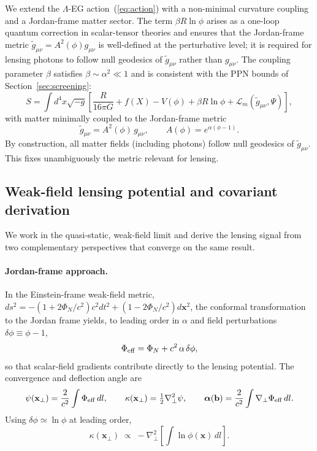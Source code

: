 \documentclass[11pt,a4paper]{article}
\begin{document}
We extend the $\Lambda$-EG action~(\ref{eq:action}) with a non-minimal curvature
coupling and a Jordan-frame matter sector. The term $\beta R\ln\phi$ arises as a
one-loop quantum correction in scalar-tensor theories and ensures that the
Jordan-frame metric $\tilde{g}_{\mu\nu} = A^2(\phi)g_{\mu\nu}$ is well-defined at
the perturbative level; it is required for lensing photons to follow null geodesics
of $\tilde{g}_{\mu\nu}$ rather than $g_{\mu\nu}$. The coupling parameter $\beta$
satisfies $\beta\sim\alpha^2\ll 1$ and is consistent with the PPN bounds of
Section~\ref{sec:screening}:
\begin{equation}
  S = \int d^4x\sqrt{-g}\left[\frac{R}{16\pi G} + f(X) - V(\phi)
  + \beta R\ln\phi
  + \mathcal{L}_m(\tilde{g}_{\mu\nu},\Psi)\right],
  \label{eq:action_lensing}
\end{equation}
with matter minimally coupled to the Jordan-frame metric
\begin{equation}
  \tilde{g}_{\mu\nu} = A^2(\phi)\,g_{\mu\nu},\qquad A(\phi) = e^{\alpha(\phi-1)}.
\end{equation}
By construction, all matter fields (including photons) follow null geodesics of
$\tilde{g}_{\mu\nu}$. This fixes unambiguously the metric relevant for lensing.

\subsection{Weak-field lensing potential and covariant derivation}
\label{subsec:lensing_WF}

We work in the quasi-static, weak-field limit and derive the lensing signal
from two complementary perspectives that converge on the same result.

\paragraph{Jordan-frame approach.}
In the Einstein-frame weak-field metric,
$ds^2 = -(1+2\Phi_N/c^2)c^2dt^2 + (1-2\Phi_N/c^2)d\mathbf{x}^2$,
the conformal transformation to the Jordan frame yields, to leading order in
$\alpha$ and field perturbations $\delta\phi \equiv \phi - 1$,
\begin{equation}
  \Phi_{\rm eff} = \Phi_N + c^2\,\alpha\,\delta\phi,
  \label{eq:Phieff}
\end{equation}
so that scalar-field gradients contribute directly to the lensing potential.
The convergence and deflection angle are
\begin{equation}
  \psi(\mathbf{x}_\perp) = \frac{2}{c^2}\int\Phi_{\rm eff}\,dl,
  \qquad
  \kappa(\mathbf{x}_\perp) = \tfrac{1}{2}\nabla_\perp^2\psi,
  \qquad
  \boldsymbol{\alpha}(\mathbf{b}) = \frac{2}{c^2}\int\nabla_\perp\Phi_{\rm eff}\,dl.
\end{equation}
Using $\delta\phi \simeq \ln\phi$ at leading order,
\begin{equation}
  \boxed{\kappa(\mathbf{x}_\perp) \;\propto\;
  -\nabla_\perp^2\!\left[\int\ln\phi(\mathbf{x})\,dl\right].}
  \label{eq:kappa}
\end{equation}
\end{document}
